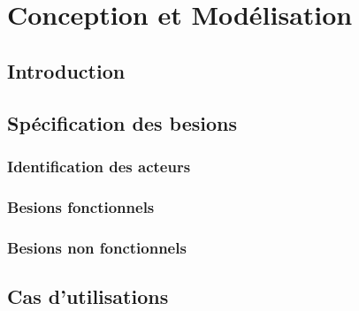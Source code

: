 
\chapter{Conception et Modélisation}
\section{Introduction}
\section{Spécification des besions}

\subsection{Identification des acteurs}
\subsection{Besions fonctionnels}
\subsection{Besions non fonctionnels}

\section{Cas d'utilisations}